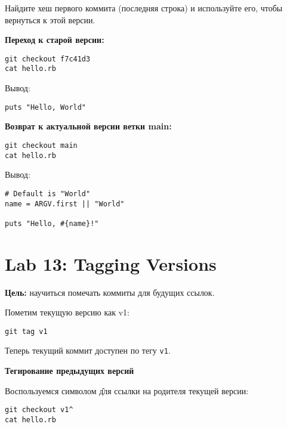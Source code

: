\documentclass[a4paper,12pt]{report}
\begin{document}
Найдите хеш первого коммита (последняя строка) и используйте его, чтобы вернуться к этой версии.

\textbf{Переход к старой версии:}
\begin{verbatim}
git checkout f7c41d3
cat hello.rb
\end{verbatim}

Вывод:
\begin{verbatim}
puts "Hello, World"
\end{verbatim}


\textbf{Возврат к актуальной версии ветки main:}
\begin{verbatim}
git checkout main
cat hello.rb
\end{verbatim}

Вывод:
\begin{verbatim}
# Default is "World"
name = ARGV.first || "World"

puts "Hello, #{name}!"
\end{verbatim}


\section{Lab 13: Tagging Versions}
\textbf{Цель:} научиться помечать коммиты для будущих ссылок.

Пометим текущую версию как v1:
\begin{verbatim}
git tag v1
\end{verbatim}

Теперь текущий коммит доступен по тегу \texttt{v1}.

\textbf{Тегирование предыдущих версий}

Воспользуемся символом \^ для ссылки на родителя текущей версии:
\begin{verbatim}
git checkout v1^
cat hello.rb
\end{verbatim}

\end{document}
